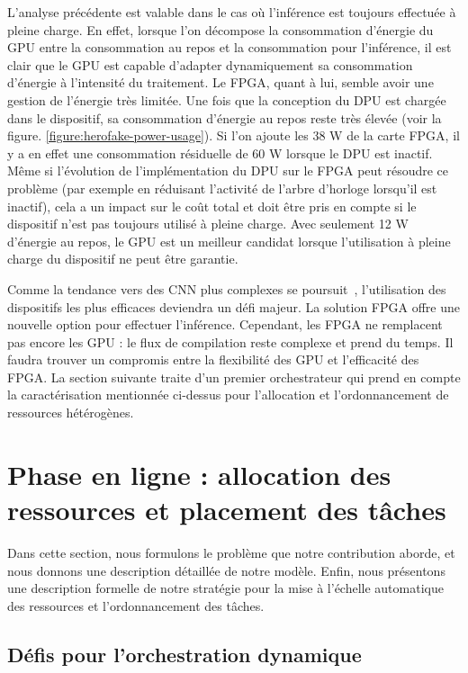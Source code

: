 L'analyse précédente est valable dans le cas où l'inférence est toujours effectuée à pleine charge. En effet, lorsque l'on décompose la consommation d'énergie du GPU entre la consommation au repos et la consommation pour l'inférence, il est clair que le GPU est capable d'adapter dynamiquement sa consommation d'énergie à l'intensité du traitement. Le FPGA, quant à lui, semble avoir une gestion de l'énergie très limitée. Une fois que la conception du DPU est chargée dans le dispositif, sa consommation d'énergie au repos reste très élevée (voir la figure. \ref{figure:herofake-power-usage}). Si l'on ajoute les 38 W de la carte FPGA, il y a en effet une consommation résiduelle de 60 W lorsque le DPU est inactif. Même si l'évolution de l'implémentation du DPU sur le FPGA peut résoudre ce problème (par exemple en réduisant l'activité de l'arbre d'horloge lorsqu'il est inactif), cela a un impact sur le coût total et doit être pris en compte si le dispositif n'est pas toujours utilisé à pleine charge. Avec seulement 12 W d'énergie au repos, le GPU est un meilleur candidat lorsque l'utilisation à pleine charge du dispositif ne peut être garantie.

Comme la tendance vers des CNN plus complexes se poursuit~\cite{8807741}, l'utilisation des dispositifs les plus efficaces deviendra un défi majeur. La solution FPGA offre une nouvelle option pour effectuer l'inférence. Cependant, les FPGA ne remplacent pas encore les GPU : le flux de compilation reste complexe et prend du temps. Il faudra trouver un compromis entre la flexibilité des GPU et l'efficacité des FPGA. La section suivante traite d'un premier orchestrateur qui prend en compte la caractérisation mentionnée ci-dessus pour l'allocation et l'ordonnancement de ressources hétérogènes.

\section{Phase en ligne : allocation des ressources et placement des tâches}
\label{section:herofake-online}

Dans cette section, nous formulons le problème que notre contribution aborde, et nous donnons une description détaillée de notre modèle. Enfin, nous présentons une description formelle de notre stratégie pour la mise à l'échelle automatique des ressources et l'ordonnancement des tâches. 

\subsection{Défis pour l'orchestration dynamique}

